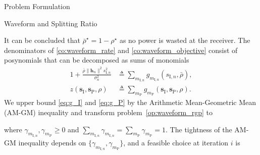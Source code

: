 \documentclass[journal]{IEEEtran}
\begin{document}
\begin{section}{Problem Formulation}
\begin{subsection}{Waveform and Splitting Ratio}
\begin{mini!}
				\label{co:waveform_objective}
				\label{co:waveform_rate}
				\label{co:waveform_power}
				\label{co:waveform_splitting_ratio}
			\end{mini!}
			It can be concluded that $\bar{\rho}^{\star}=1-\rho^{\star}$ as no power is wasted at the receiver. The denominators of \eqref{co:waveform_rate} and \eqref{co:waveform_objective} consist of posynomials \cite{Boyd2007} that can be decomposed as sums of monomials
			\begin{align}
				1+\frac{\bar{\rho}\lVert{\boldsymbol{h}_n}\rVert^2 s_{\mathrm{I},n}^2}{\sigma_n^2} &\triangleq \sum_{m_{\mathrm{I},n}}g_{m_{\mathrm{I},n}}(s_{\mathrm{I},n},\bar{\rho})\label{eq:g_I},\\
				z(\boldsymbol{s}_{\mathrm{I}},\boldsymbol{s}_\mathrm{P},\rho) &\triangleq \sum_{m_\mathrm{P}}{g_{m_\mathrm{P}}(\boldsymbol{s}_{\mathrm{I}},\boldsymbol{s}_\mathrm{P},\rho)}\label{eq:g_P}.
			\end{align}
			We upper bound \eqref{eq:g_I} and \eqref{eq:g_P} by the Arithmetic Mean-Geometric Mean (AM-GM) inequality \cite{Chiang2005} and transform problem~\eqref{op:waveform_rgp} to
			\begin{mini!}
				{}{}{\label{op:waveform_gp}}{}
			\end{mini!}
			where $\gamma_{m_{\mathrm{I},n}},\gamma_{m_\mathrm{P}} \ge 0$ and $\sum_{m_{\mathrm{I},n}}\gamma_{m_{\mathrm{I},n}}=\sum_{m_\mathrm{P}}\gamma_{m_\mathrm{P}}=1$. The tightness of the AM-GM inequality depends on $\{\gamma_{m_{\mathrm{I},n}},\gamma_{m_\mathrm{P}}\}$, and a feasible choice at iteration $i$ is

\end{subsection}
\end{section}
\end{document}
